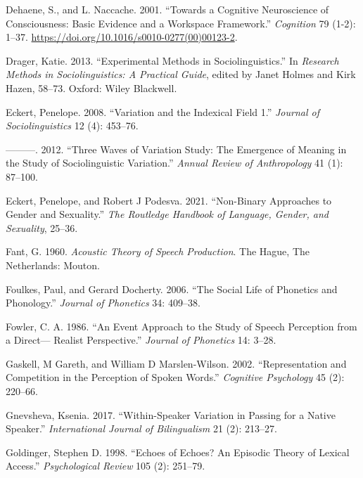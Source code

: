 \documentclass[
  letterpaper,
  DIV=11,
  numbers=noendperiod]{scrartcl}
\newlength{\cslhangindent}
\newenvironment{CSLReferences}[2] %
 {\begin{list}{}{%
  \setlength{\itemindent}{0pt}
  \setlength{\leftmargin}{0pt}
  \setlength{\parsep}{0pt}
  \ifodd #1
   \setlength{\leftmargin}{\cslhangindent}
   \setlength{\itemindent}{-1\cslhangindent}
  \fi
  \setlength{\itemsep}{#2\baselineskip}}}
 {\end{list}}
\begin{document}
\begin{CSLReferences}{1}{0}
Dehaene, S., and L. Naccache. 2001. {``Towards a Cognitive Neuroscience
of Consciousness: Basic Evidence and a Workspace Framework.''}
\emph{Cognition} 79 (1-2): 1--37.
\url{https://doi.org/10.1016/s0010-0277(00)00123-2}.

Drager, Katie. 2013. {``Experimental Methods in Sociolinguistics.''} In
\emph{Research Methods in Sociolinguistics: A Practical Guide}, edited
by Janet Holmes and Kirk Hazen, 58--73. Oxford: Wiley Blackwell.

Eckert, Penelope. 2008. {``Variation and the Indexical Field 1.''}
\emph{Journal of Sociolinguistics} 12 (4): 453--76.

---------. 2012. {``Three Waves of Variation Study: {The} Emergence of
Meaning in the Study of Sociolinguistic Variation.''} \emph{Annual
Review of Anthropology} 41 (1): 87--100.

Eckert, Penelope, and Robert J Podesva. 2021. {``Non-Binary Approaches
to Gender and Sexuality.''} \emph{The Routledge Handbook of Language,
Gender, and Sexuality}, 25--36.

Fant, G. 1960. \emph{Acoustic Theory of Speech Production}. The Hague,
The Netherlands: Mouton.

Foulkes, Paul, and Gerard Docherty. 2006. {``The Social Life of
Phonetics and Phonology.''} \emph{Journal of Phonetics} 34: 409--38.

Fowler, C. A. 1986. {``An Event Approach to the Study of Speech
Perception from a Direct--- Realist Perspective.''} \emph{Journal of
Phonetics} 14: 3--28.

Gaskell, M Gareth, and William D Marslen-Wilson. 2002. {``Representation
and Competition in the Perception of Spoken Words.''} \emph{Cognitive
Psychology} 45 (2): 220--66.

Gnevsheva, Ksenia. 2017. {``Within-Speaker Variation in Passing for a
Native Speaker.''} \emph{International Journal of Bilingualism} 21 (2):
213--27.

Goldinger, Stephen D. 1998. {``Echoes of Echoes? An Episodic Theory of
Lexical Access.''} \emph{Psychological Review} 105 (2): 251--79.


\end{CSLReferences}
\end{document}
